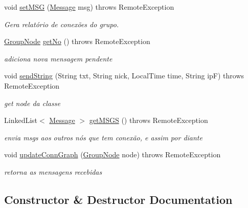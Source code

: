 \begin{DoxyCompactItemize}
\item 
void \hyperlink{classserver_1_1_broadcast_impl_a264c486f39faa2ab66a7d5a2a0c245b1}{set\+M\+SG} (\hyperlink{classstructure_1_1_message}{Message} msg)  throws Remote\+Exception
\begin{DoxyCompactList}\small\item\em Gera relatório de conexões do grupo. \end{DoxyCompactList}\item 
\hyperlink{classstructure_1_1_group_node}{Group\+Node} \hyperlink{classserver_1_1_broadcast_impl_a7e004ba2fd22f9225c278f1b5bbe4dbb}{get\+No} ()  throws Remote\+Exception
\begin{DoxyCompactList}\small\item\em adiciona nova mensagem pendente \end{DoxyCompactList}\item 
void \hyperlink{classserver_1_1_broadcast_impl_a5abfc6721496474d39d6b2b31589d11b}{send\+String} (String txt, String nick, Local\+Time time, String ipF)  throws Remote\+Exception
\begin{DoxyCompactList}\small\item\em get node da classe \end{DoxyCompactList}\item 
Linked\+List$<$ \hyperlink{classstructure_1_1_message}{Message} $>$ \hyperlink{classserver_1_1_broadcast_impl_aecb6cd49880c2e908b1ba3d17c454ced}{get\+M\+S\+GS} ()  throws Remote\+Exception
\begin{DoxyCompactList}\small\item\em envia msgs aos outros nós que tem conexão, e assim por diante \end{DoxyCompactList}\item 
void \hyperlink{classserver_1_1_broadcast_impl_abf98d794cdcf469b48cae2fbb23f1479}{update\+Conn\+Graph} (\hyperlink{classstructure_1_1_group_node}{Group\+Node} node)  throws Remote\+Exception 
\begin{DoxyCompactList}\small\item\em retorna as mensagens recebidas \end{DoxyCompactList}\end{DoxyCompactItemize}


\subsection{Constructor \& Destructor Documentation}
\mbox{\label{classserver_1_1_broadcast_impl_a32e3892e38d83045f927f81bca2a0ed9}} 

